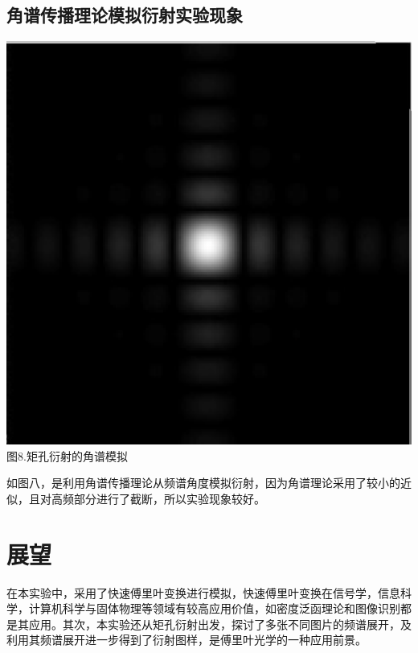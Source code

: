 \documentclass[a4paper,12pt]{article}
\begin{document}
\subsection{角谱传播理论模拟衍射实验现象}
\begin{center}
	\includegraphics[scale=0.25]{Pica8.png}\\
	图8.矩孔衍射的角谱模拟
\end{center}\vspace{0.2cm}
如图八，是利用角谱传播理论从频谱角度模拟衍射，因为角谱理论采用了较小的近似，且对高频部分进行了截断，所以实验现象较好。
\newpage	

\section{展望}
	在本实验中，采用了快速傅里叶变换进行模拟，快速傅里叶变换在信号学，信息科学，计算机科学与固体物理等领域有较高应用价值，如密度泛函理论和图像识别都是其应用。其次，本实验还从矩孔衍射出发，探讨了多张不同图片的频谱展开，及利用其频谱展开进一步得到了衍射图样，是傅里叶光学的一种应用前景。
		
\end{document}
